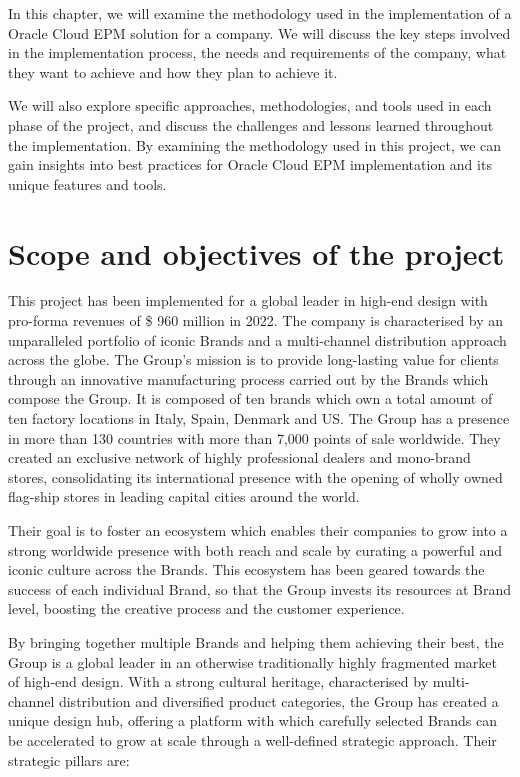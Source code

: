\documentclass[12pt,a4paper,openright,twoside]{book}
\begin{document}
In this chapter, we will examine the methodology used in the implementation of a Oracle Cloud EPM solution for a company.
%
We will discuss the key steps involved in the implementation process, the needs and requirements of the company, what they want to achieve and how they plan to achieve it.

We will also explore specific approaches, methodologies, and tools used in each phase of the project, and discuss the challenges and lessons learned throughout the implementation. 
%
By examining the methodology used in this project, we can gain insights into best practices for Oracle Cloud EPM implementation and its unique features and tools.

\section{Scope and objectives of the project}

This project has been implemented for a global leader in high-end design with pro-forma revenues of \$ 960 million in 2022.
%
The company is characterised by an unparalleled portfolio of iconic Brands and a multi-channel distribution approach across the globe.
%
The Group’s mission is to provide long-lasting value for clients through an innovative manufacturing process carried out by the Brands which compose the Group.
%
It is composed of ten brands which own a total amount of ten factory locations in Italy, Spain, Denmark and US.
%
The Group has a presence in more than 130 countries with more than 7,000 points of sale worldwide. 
%
They created an exclusive network of highly professional dealers and mono-brand stores, consolidating its international presence with the opening of wholly owned flag-ship stores in leading capital cities around the world.

Their goal is to foster an ecosystem which enables their companies to grow into a strong worldwide presence with both reach and scale by curating a powerful and iconic culture across the Brands.
%
This ecosystem has been geared towards the success of each individual Brand, so that the Group invests its resources at Brand level, boosting the creative process and the customer experience.

By bringing together multiple Brands and helping them achieving their best, the Group is a global leader in an otherwise traditionally highly fragmented market of high-end design. 
%
With a strong cultural heritage, characterised by multi-channel distribution and diversified product categories, the Group has created a unique design hub, offering a platform with which carefully selected Brands can be accelerated to grow at scale through a well-defined strategic approach.
%
Their strategic pillars are:
\end{document}
